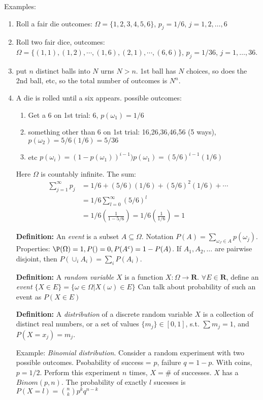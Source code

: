 Examples:
\begin{enumerate}
\item Roll a fair die outcomes: $\Omega=\{1,2,3,4,5,6\}$, $p_j = 1/6$, $j=1,2,\dots,6$
\item Roll two fair dice, outcomes: $\Omega=\{(1,1), (1,2), \cdots, (1,6),
  (2,1), \cdots, (6,6)\}$, $p_j = 1/36$, $j=1,\dots,36$.
\item put $n$ distinct balls into $N$ urns $N>n$. 1st ball has $N$ choices, so does the 2nd ball, etc, so
  the total number of outcomes is $N^n$.
\item A die is rolled until a six appears. possible outcomes:
  \begin{enumerate}
  \item Get a 6 on 1st trial: 6, $p(\omega_1)=1/6$
  \item something other than 6 on 1st trial: 16,26,36,46,56 (5 ways),
    $p(\omega_2) = 5/6(1/6) = 5/36$
  \item etc $p(\omega_i) = (1-p(\omega_1))^{i-1})p(\omega_1) = (5/6)^{i-1}(1/6)$
  \end{enumerate}
Here $\Omega$ is countably infinite. The sum:
\begin{align*}
\sum_{j=1}^\infty p_j &= 1/6 + (5/6)(1/6) + (5/6)^2(1/6) + \cdots\\
&=1/6\sum_{l=0}^\infty (5/6)^l\\
 &= 1/6(\frac{1}{1-5/6}) = 1/6(\frac{1}{1/6}) = 1
\end{align*} 

 \textbf{Definition:} An \emph{event} is a subset $A \subseteq
 \Omega$. Notation $P(A) = \sum_{\omega_J \in A}
 p(\omega_j)$. Properties: $\P(\Omega) =1, P(\empty)=0,
 P(A^c)=1-P(A)$.
If $A_1, A_2, \dots$ are pairwise disjoint, then $P(\cup_i A_i) =
\sum_i P(A_i)$.

\textbf{Definition:} A \emph{random variable} $X$ is a function
$X:\Omega \rightarrow \mathbf{R}$. $\forall E\in \mathbf{R}$, define
an \emph{event} $\{X\in E\} = \{\omega \in \Omega | X(\omega) \in E\}$
Can talk about probability of such an event as $P(X\in E)$

\textbf{Definition:} A \emph{distribution} of a discrete random
variable $X$ is a collection of distinct real numbers, or a set of
values $\{m_j\}\in [0,1]$, s.t. $\sum m_j = 1$, and $P(X=x_j) = m_j$.

Example: \emph{Binomial distribution}. Consider a random experiment
with two possible outcomes. Psobability of success = $p$, failure
$q=1-p$.
With coins, $p=1/2$. Perform this experiment $n$ times, $X=$\# of
successes. $X$ has a $Binom(p,n)$. The probability of exactly $l$
sucesses is $P(X=l) = {n \choose k} p^kq^{n-k}$
\pagebreak

\end{enumerate}
